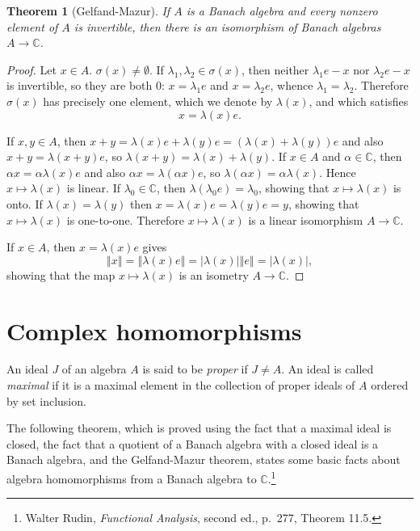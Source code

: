 \documentclass{article}
\newcommand{\norm}[1]{\left\Vert #1 \right\Vert}
\newtheorem{theorem}{Theorem}
\theoremstyle{definition}
\begin{document}
\begin{theorem}[Gelfand-Mazur]
If $A$ is a Banach algebra and every nonzero element of $A$   is invertible, then there is an isomorphism of Banach algebras $A \to \mathbb{C}$.
\end{theorem}
\begin{proof}
Let $x \in A$. $\sigma(x) \neq \emptyset$.
If $\lambda_1,\lambda_2 \in \sigma(x)$, then neither
$\lambda_1 e -x$ nor $\lambda_2 e -x$ is  invertible, so they are both $0$: $x = \lambda_1 e$ and $x = \lambda_2 e$, whence
$\lambda_1 = \lambda_2$. Therefore $\sigma(x)$ has precisely one element, which we denote by $\lambda(x)$, and which satisfies
\[
x= \lambda(x) e.
\]

If $x,y \in A$, then
$x+y=\lambda(x)e+\lambda(y)e = (\lambda(x)+\lambda(y))e$
and also $x+y = \lambda(x+y)e$, so
$\lambda(x+y)=\lambda(x)+\lambda(y)$. If $x \in A$ and $\alpha \in \mathbb{C}$, then
$\alpha x = \alpha \lambda(x)e$ and also $\alpha x = \lambda(\alpha x)e$, so $\lambda(\alpha x)=\alpha \lambda(x)$. Hence
$x \mapsto \lambda(x)$ is linear. If $\lambda_0 \in \mathbb{C}$, then $\lambda(\lambda_0 e)=\lambda_0$, showing that $x \mapsto \lambda(x)$
is  onto. If $\lambda(x)=\lambda(y)$ then $x=\lambda(x)e = \lambda(y)e = y$, showing that $x \mapsto \lambda(x)$ is one-to-one. Therefore
$x \mapsto \lambda(x)$ is a linear isomorphism $A \to \mathbb{C}$.

If $x \in A$, then $x = \lambda(x)e$ gives
\[
\norm{x} = \norm{\lambda(x) e} = |\lambda(x)| \norm{e} = |\lambda(x)|,
\]
showing that the map $x \mapsto \lambda(x)$ is an isometry $A \to \mathbb{C}$.
\end{proof}


\section{Complex homomorphisms}
An ideal $J$ of an algebra $A$ is said to be {\em proper} if $J \neq A$. An ideal is called {\em maximal} if it is a maximal element
in the collection of proper ideals of $A$ ordered by set inclusion.

The following theorem, which is proved using the fact  that a maximal
ideal is closed, the fact that a quotient of a Banach algebra with a closed ideal is a Banach algebra, and the Gelfand-Mazur theorem, states some basic facts about algebra
homomorphisms from a Banach algebra to $\mathbb{C}$.\footnote{Walter Rudin, {\em Functional Analysis}, second ed.,
p.~277, Theorem 11.5.}
\end{document}
